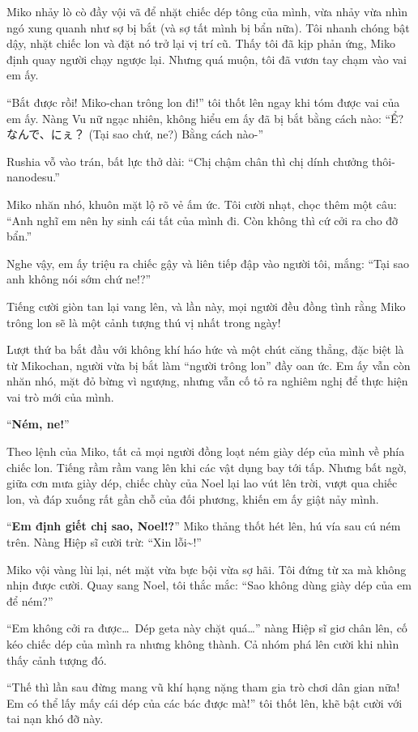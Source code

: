 \documentclass[../main.tex]{subfiles}
\begin{document}
Miko nhảy lò cò đầy vội vã để nhặt chiếc dép tông của mình, vừa nhảy vừa nhìn ngó xung quanh như sợ bị bắt (và sợ tất mình bị bẩn nữa). Tôi nhanh chóng bật dậy, nhặt chiếc lon và đặt nó trở lại vị trí cũ. Thấy tôi đã kịp phản ứng, Miko định quay người chạy ngược lại. Nhưng quá muộn, tôi đã vươn tay chạm vào vai em ấy.

``Bắt được rồi! Miko-chan trông lon đi!'' tôi thốt lên ngay khi tóm được vai của em ấy. Nàng Vu nữ ngạc nhiên, không hiểu em ấy đã bị bắt bằng cách nào: ``Ể? なんで、にぇ？ (Tại sao chứ, ne?) Bằng cách nào-''

Rushia vỗ vào trán, bất lực thở dài: ``Chị chậm chân thì chị dính chưởng thôi-nanodesu.''

Miko nhăn nhó, khuôn mặt lộ rõ vẻ ấm ức. Tôi cười nhạt, chọc thêm một câu: ``Anh nghĩ em nên hy sinh cái tất của mình đi. Còn không thì cứ cởi ra cho đỡ bẩn.''

Nghe vậy, em ấy triệu ra chiếc gậy và liên tiếp đập vào người tôi, mắng: ``Tại sao anh không nói sớm chứ ne!?''

Tiếng cười giòn tan lại vang lên, và lần này, mọi người đều đồng tình rằng Miko trông lon sẽ là một cảnh tượng thú vị nhất trong ngày!

Lượt thứ ba bắt đầu với không khí háo hức và một chút căng thẳng, đặc biệt là từ Mikochan, người vừa bị bắt làm ``người trông lon'' đầy oan ức. Em ấy vẫn còn nhăn nhó, mặt đỏ bừng vì ngượng, nhưng vẫn cố tỏ ra nghiêm nghị để thực hiện vai trò mới của mình.

``\textbf{Ném, ne!}''

Theo lệnh của Miko, tất cả mọi người đồng loạt ném giày dép của mình về phía chiếc lon. Tiếng rầm rầm vang lên khi các vật dụng bay tới tấp. Nhưng bất ngờ, giữa cơn mưa giày dép, chiếc chùy của Noel lại lao vút lên trời, vượt qua chiếc lon, và đáp xuống rất gần chỗ của đối phương, khiến em ấy giật nảy mình.

``\textbf{Em định giết chị sao, Noel!?}'' Miko thảng thốt hét lên, hú vía sau cú ném trên. Nàng Hiệp sĩ cười trừ: ``Xin lỗi\~{}!''

Miko vội vàng lùi lại, nét mặt vừa bực bội vừa sợ hãi. Tôi đứng từ xa mà không nhịn được cười. Quay sang Noel, tôi thắc mắc: ``Sao không dùng giày dép của em để ném?''

``Em không cởi ra được\dots\ Dép geta này chặt quá\dots'' nàng Hiệp sĩ giơ chân lên, cố kéo chiếc dép của mình ra nhưng không thành. Cả nhóm phá lên cười khi nhìn thấy cảnh tượng đó.

``Thế thì lần sau đừng mang vũ khí hạng nặng tham gia trò chơi dân gian nữa! Em có thể lấy mấy cái dép của các bác được mà!'' tôi thốt lên, khẽ bật cười với tai nạn khó đỡ này.
\end{document}
